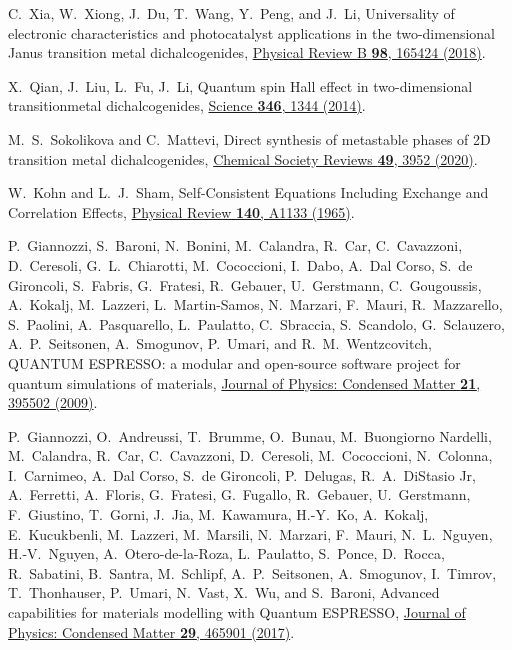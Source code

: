 \documentclass[reprint, superscriptaddress, amsmath,amssymb,prb,twocolumn]{revtex4-2}
\begin{document}
\begin{thebibliography}{116}
 C.~Xia, W.~Xiong, J.~Du, T.~Wang, Y.~Peng, and J.~Li, Universality of electronic characteristics and photocatalyst applications in the two-dimensional Janus transition metal dichalcogenides, \href{https://doi.org/10.1103/PhysRevB.98.165424}{Physical Review B {\bf 98}, 165424 (2018)}.

 X.~Qian, J.~Liu, L.~Fu, J.~Li, Quantum spin Hall effect in two-dimensional transitionmetal dichalcogenides, \href{https://dx.doi.org/10.1126/science.1256815}{Science {\bf 346}, 1344 (2014)}.

 M.~S.~Sokolikova and C.~Mattevi, Direct synthesis of metastable phases of 2D transition metal dichalcogenides, \href{https://dx.doi.org/10.1039/D0CS00143K}{Chemical Society Reviews {\bf 49}, 3952 (2020)}.


 W.~Kohn and L.~J.~Sham, Self-Consistent Equations Including Exchange and Correlation Effects, \href{https://dx.doi.org/10.1103/PhysRev.140.A1133}{Physical Review {\bf 140}, A1133 (1965)}.

 P.~Giannozzi, S.~Baroni, N.~Bonini, M.~Calandra, R.~Car, C.~Cavazzoni, D.~Ceresoli, G.~L.~Chiarotti, M.~Cococcioni, I.~Dabo, A.~Dal Corso, S.~de Gironcoli, S.~Fabris, G.~Fratesi, R.~Gebauer, U.~Gerstmann, C.~Gougoussis, A.~Kokalj, M.~Lazzeri, L.~Martin-Samos, N.~Marzari, F.~Mauri, R.~Mazzarello, S.~Paolini, A.~Pasquarello, L.~Paulatto, C.~Sbraccia, S.~Scandolo, G.~Sclauzero, A.~P.~Seitsonen, A.~Smogunov, P.~Umari, and R.~M.~Wentzcovitch, QUANTUM ESPRESSO: a modular and open-source software project for quantum simulations of materials, \href{https://dx.doi.org/10.1088/0953-8984/21/39/395502}{Journal of Physics: Condensed Matter {\bf 21}, 395502 (2009)}.

 P.~Giannozzi, O.~Andreussi, T.~Brumme, O.~Bunau, M.~Buongiorno Nardelli, M.~Calandra, R.~Car, C.~Cavazzoni, D.~Ceresoli, M.~Cococcioni, N.~Colonna, I.~Carnimeo, A.~Dal Corso, S.~de Gironcoli, P.~Delugas, R.~A.~DiStasio Jr, A.~Ferretti, A.~Floris, G.~Fratesi, G.~Fugallo, R.~Gebauer, U.~Gerstmann, F.~Giustino, T.~Gorni, J.~Jia, M.~Kawamura, H.-Y.~Ko, A.~Kokalj, E.~Kucukbenli, M.~Lazzeri, M.~Marsili, N.~Marzari, F.~Mauri, N.~L.~Nguyen, H.-V.~Nguyen, A.~Otero-de-la-Roza, L.~Paulatto, S.~Ponce, D.~Rocca, R.~Sabatini, B.~Santra, M.~Schlipf, A.~P.~Seitsonen, A.~Smogunov, I.~Timrov, T.~Thonhauser, P.~Umari, N.~Vast, X.~Wu, and S.~Baroni, Advanced capabilities for materials modelling with Quantum ESPRESSO, \href{https://dx.doi.org/10.1088/1361-648X/aa8f79}{Journal of Physics: Condensed Matter {\bf 29}, 465901 (2017)}.


\end{thebibliography}
\end{document}
